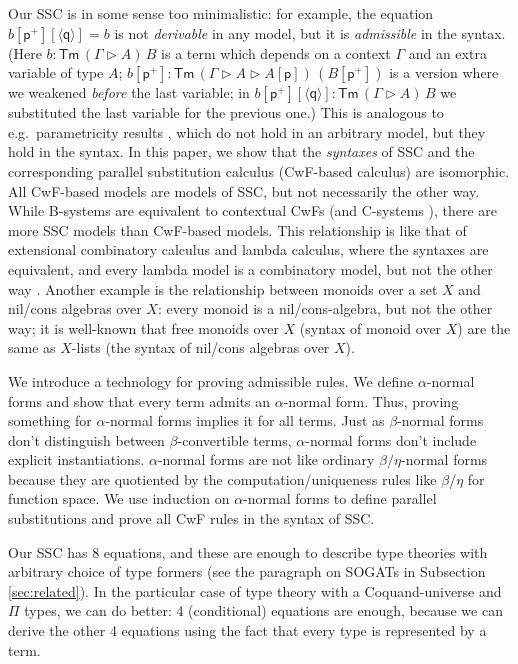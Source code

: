 \documentclass[submission,copyright,creativecommons]{eptcs}
\newcommand{\Tm}{\mathsf{Tm}}
\newcommand{\p}{\mathsf{p}}
\newcommand{\q}{\mathsf{q}}
\newcommand{\ext}{\mathop{\triangleright}}
\begin{document}
Our SSC is in some sense too minimalistic: for example, the equation
$b[\p^+][\langle\q\rangle] = b$ is not \emph{derivable} in any model,
but it is \emph{admissible} in the syntax. (Here $b : \Tm\,(\Gamma\ext
A)\,B$ is a term which depends on a context $\Gamma$ and an extra
variable of type $A$; $b[\p^+] : \Tm\,(\Gamma\ext A\ext
A[\p])\,(B[\p^+])$ is a version where we weakened \emph{before} the
last variable; in $b[\p^+][\langle\q\rangle] : \Tm\,(\Gamma\ext A)\,B$
we substituted the last variable for the previous one.)  This is
analogous to e.g.\ parametricity results
\cite{DBLP:journals/jfp/BernardyJP12}, which do not hold in an
arbitrary model, but they hold in the syntax. In this paper, we show
that the \emph{syntaxes} of SSC and the corresponding parallel
substitution calculus (CwF-based calculus) are isomorphic. All
CwF-based models are models of SSC, but not
necessarily the other way. While B-systems are equivalent to contextual CwFs (and
C-systems \cite{bc}), there are more
SSC models than CwF-based models. This relationship is like that
of extensional combinatory calculus and lambda calculus, where the
syntaxes are equivalent, and every lambda model is a combinatory
model, but not the other way
\cite{DBLP:conf/fscd/AltenkirchKSV23}. Another example is the
relationship between monoids over a set $X$ and nil/cons algebras over
$X$: every monoid is a nil/cons-algebra, but not the other way;
it is well-known that free monoids over $X$ (syntax of monoid over
$X$) are the same as $X$-lists (the syntax of nil/cons algebras
over $X$).

We introduce a technology for proving admissible rules. We define $\alpha$-normal forms and show that every term admits an $\alpha$-normal form.
Thus, proving something for $\alpha$-normal forms implies it for all terms.
Just as $\beta$-normal forms
don't distinguish between $\beta$-convertible terms, $\alpha$-normal
forms don't include explicit instantiations. $\alpha$-normal forms are
not like ordinary $\beta/\eta$-normal forms because they are 
quotiented by the computation/uniqueness rules like $\beta$/$\eta$ for
function space. We use induction on $\alpha$-normal forms to define
parallel substitutions and prove all CwF rules in the syntax
of SSC.

Our SSC has 8 equations, and these are enough to describe type
theories with arbitrary choice of type formers (see the paragraph on
SOGATs in Subsection \ref{sec:related}). In the particular case of
type theory with a Coquand-universe and $\Pi$ types, we can do better:
4 (conditional) equations are enough, because we can derive the
other 4 equations using the fact that every type is represented by a
term.
\end{document}
